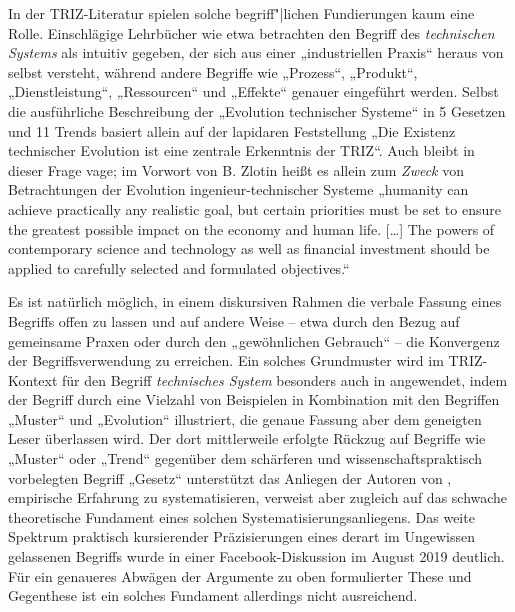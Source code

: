 \documentclass[12pt,a4paper]{article}
\begin{document}
In der TRIZ-Literatur spielen solche begriff"|lichen Fundierungen kaum eine
Rolle.  Einschlägige Lehrbücher wie etwa \cite{KS2017} betrachten den Begriff
des \emph{technischen Systems} als intuitiv gegeben, der sich aus einer
„industriellen Praxis“ heraus \cite[S. 2]{KS2017} von selbst versteht, während
andere Begriffe wie „Prozess“, „Produkt“, „Dienstleistung“, „Ressourcen“ und
„Effekte“ \cite[S. 6--10]{KS2017} genauer eingeführt werden. Selbst die
ausführliche Beschreibung der „Evolution technischer Systeme“ in 5 Gesetzen
und 11 Trends \cite[Kap. 4.8]{KS2017} basiert allein auf der lapidaren
Feststellung „Die Existenz technischer Evolution ist eine zentrale Erkenntnis
der TRIZ“.  Auch \cite{TESE2018} bleibt in dieser Frage vage; im Vorwort von
B. Zlotin heißt es allein zum \emph{Zweck} von Betrachtungen der Evolution
ingenieur-technischer Systeme „humanity can achieve practically any realistic
goal, but certain priorities must be set to ensure the greatest possible
impact on the economy and human life. [\ldots] The powers of contemporary
science and technology as well as financial investment should be applied to
carefully selected and formulated objectives.“

Es ist natürlich möglich, in einem diskursiven Rahmen die verbale Fassung
eines Begriffs offen zu lassen und auf andere Weise -- etwa durch den Bezug
auf gemeinsame Praxen oder durch den „gewöhnlichen Gebrauch“ -- die Konvergenz
der Begriffsverwendung zu erreichen.  Ein solches Grundmuster wird im
TRIZ-Kontext für den Begriff \emph{technisches System} besonders auch in
\cite{TESE2018} angewendet, indem der Begriff durch eine Vielzahl von
Beispielen in Kombination mit den Begriffen „Muster“ und „Evolution“
illustriert, die genaue Fassung aber dem geneigten Leser überlassen wird.  Der
dort mittlerweile erfolgte Rückzug auf Begriffe wie „Muster“ oder „Trend“
gegenüber dem schärferen und wissenschaftspraktisch vorbelegten Begriff
„Gesetz“ unterstützt das Anliegen der Autoren von \cite{TESE2018}, empirische
Erfahrung zu systematisieren, verweist aber zugleich auf das schwache
theoretische Fundament eines solchen Systematisierungsanliegens.  Das weite
Spektrum praktisch kursierender Präzisierungen eines derart im Ungewissen
gelassenen Begriffs wurde in einer Facebook-Diskussion \cite{Graebe2019b} im
August 2019 deutlich. Für ein genaueres Abwägen der Argumente zu oben
formulierter These und Gegenthese ist ein solches Fundament allerdings nicht
ausreichend.
\end{document}
